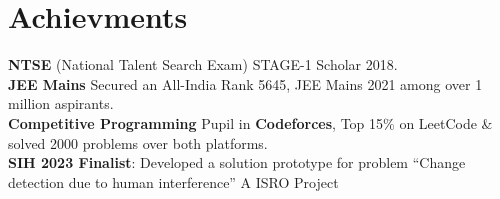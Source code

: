 \section{Achievments}
    \begin{itemize}[leftmargin=0.15in, label={}]
	\small{\item{
		\textbf{NTSE}{ (National Talent Search Exam) STAGE-1 Scholar 2018. } \\
		\textbf{JEE Mains}{ Secured an All-India Rank 5645, JEE Mains 2021 among over 1 million aspirants. } \\
		\textbf{Competitive Programming}{ Pupil in 
 \textbf{Codeforces}, Top 15\% on LeetCode & solved 2000 problems over both platforms. } \\
  		\textbf{SIH 2023 Finalist}{: Developed a solution prototype for problem “Change detection due to human interference” A ISRO Project}
	}}
    \end{itemize}


